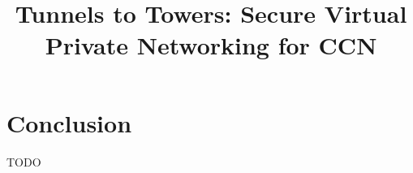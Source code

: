 \documentclass[conference,letterpaper,10pt]{IEEEtran}
\begin{document}
\title{Tunnels to Towers: Secure Virtual Private Networking for CCN}


\maketitle


\begin{abstract}

\end{abstract}

\begin{IEEEkeywords}
\end{IEEEkeywords}

\IEEEpeerreviewmaketitle









\section{Conclusion}\label{conclusion}
TODO

\ifCLASSOPTIONcaptionsoff
  \newpage
\fi

\tiny




\end{document}
